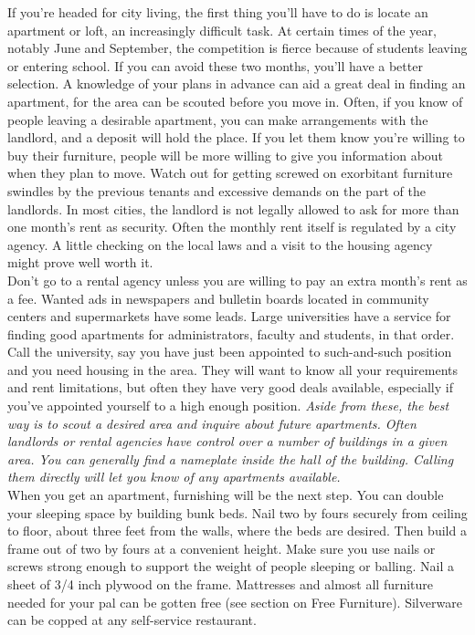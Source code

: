 \documentclass[11pt,twoside,a4paper]{book}
\begin{document}
If you're headed for city living, the first thing you'll have to do is locate an apartment or loft, an increasingly difficult task. At certain times of the year, notably June and September, the competition is fierce because of students leaving or entering school. If you can avoid these two months, you'll have a better selection. A knowledge of your plans in advance can aid a great deal in finding an apartment, for the area can be scouted before you move in. Often, if you know of people leaving a desirable apartment, you can make arrangements with the landlord, and a deposit will hold the place. If you let them know you're willing to buy their furniture, people will be more willing to give you information about when they plan to move. Watch out for getting screwed on exorbitant furniture swindles by the previous tenants and excessive demands on the part of the landlords. In most cities, the landlord is not legally allowed to ask for more than one month's rent as security. Often the monthly rent itself is regulated by a city agency. A little checking on the local laws and a visit to the housing agency might prove well worth it.~\\

Don't go to a rental agency unless you are willing to pay an extra month's rent as a fee. Wanted ads in newspapers and bulletin boards located in community centers and supermarkets have some leads. Large universities have a service for finding good apartments for administrators, faculty and students, in that order. Call the university, say you have just been appointed to such-and-such position and you need housing in the area. They will want to know all your requirements and rent limitations, but often they have very good deals available, especially if you've appointed yourself to a high enough position. \emph{Aside from these, the best way is to scout a desired area and inquire about future apartments. Often landlords or rental agencies have control over a number of buildings in a given area. You can generally find a nameplate inside the hall of the building. Calling them directly will let you know of any apartments available. }~\\

When you get an apartment, furnishing will be the next step. You can double your sleeping space by building bunk beds. Nail two by fours securely from ceiling to floor, about three feet from the walls, where the beds are desired. Then build a frame out of two by fours at a convenient height. Make sure you use nails or screws strong enough to support the weight of people sleeping or balling. Nail a sheet of 3/4 inch plywood on the frame. Mattresses and almost all furniture needed for your pal can be gotten free (see section on Free Furniture). Silverware can be copped at any self-service restaurant.
\end{document}
